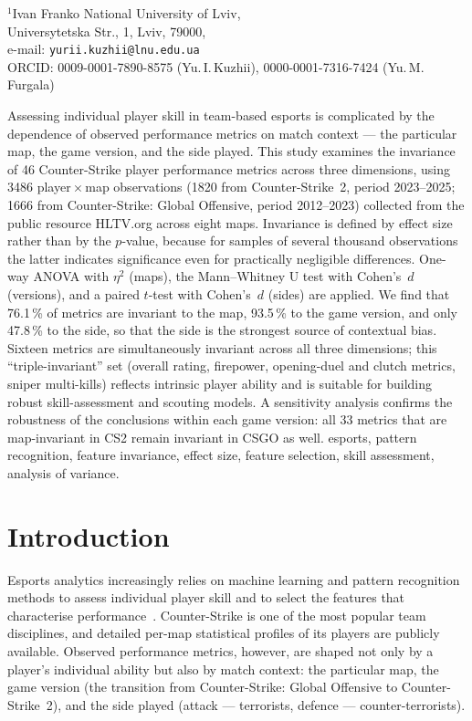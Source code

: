 \begin{Organization}
$^{1}$Ivan Franko National University of Lviv,\\
Universytetska Str., 1, Lviv, 79000,\\
e-mail: \texttt{yurii.kuzhii@lnu.edu.ua}\\
ORCID: 0009-0001-7890-8575 (Yu.\,I.\,Kuzhii), 0000-0001-7316-7424 (Yu.\,M.\,Furgala)
\end{Organization}

\begin{Abstract}
Assessing individual player skill in team-based esports is complicated by the dependence of
observed performance metrics on match context --- the particular map, the game version, and the
side played. This study examines the invariance of 46 Counter-Strike player performance metrics
across three dimensions, using 3486 player\,$\times$\,map observations (1820 from
Counter-Strike~2, period 2023--2025; 1666 from Counter-Strike: Global Offensive, period
2012--2023) collected from the public resource HLTV.org across eight maps. Invariance is defined
by effect size rather than by the $p$-value, because for samples of several thousand observations
the latter indicates significance even for practically negligible differences. One-way ANOVA with
$\eta^2$ (maps), the Mann--Whitney U test with Cohen's~$d$ (versions), and a paired $t$-test with
Cohen's~$d$ (sides) are applied. We find that 76.1\,\% of metrics are invariant to the map,
93.5\,\% to the game version, and only 47.8\,\% to the side, so that the side is the strongest
source of contextual bias. Sixteen metrics are simultaneously invariant across all three
dimensions; this ``triple-invariant'' set (overall rating, firepower, opening-duel and clutch
metrics, sniper multi-kills) reflects intrinsic player ability and is suitable for building robust
skill-assessment and scouting models. A sensitivity analysis confirms the robustness of the
conclusions within each game version: all 33 metrics that are map-invariant in CS2 remain
invariant in CSGO as well.
\KeywordsEng
esports, pattern recognition, feature invariance, effect size, feature selection,
skill assessment, analysis of variance.
\end{Abstract}

\section{Introduction}

Esports analytics increasingly relies on machine learning and pattern recognition methods to
assess individual player skill and to select the features that characterise
performance~\cite{Bishop}. Counter-Strike is one of the most popular team disciplines, and
detailed per-map statistical profiles of its players are publicly available. Observed performance
metrics, however, are shaped not only by a player's individual ability but also by match context:
the particular map, the game version (the transition from Counter-Strike: Global Offensive to
Counter-Strike~2), and the side played (attack --- terrorists, defence --- counter-terrorists).

